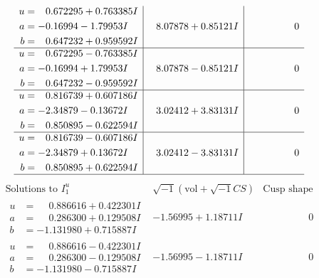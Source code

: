 \documentclass[1p]{elsarticle_modified}
\theoremstyle{definition}
\newcommand{\I}{\sqrt{-1}}
\begin{document}
$$\begin{array}{c|c|c}
\begin{aligned}
u &= \phantom{-}0.672295 + 0.763385 I \\
a &= -0.16994 - 1.79953 I \\
b &= \phantom{-}0.647232 + 0.959592 I\end{aligned}
 & \phantom{-}8.07878 + 0.85121 I & \phantom{-0.000000 } 0 \\ \hline\begin{aligned}
u &= \phantom{-}0.672295 - 0.763385 I \\
a &= -0.16994 + 1.79953 I \\
b &= \phantom{-}0.647232 - 0.959592 I\end{aligned}
 & \phantom{-}8.07878 - 0.85121 I & \phantom{-0.000000 } 0 \\ \hline\begin{aligned}
u &= \phantom{-}0.816739 + 0.607186 I \\
a &= -2.34879 - 0.13672 I \\
b &= \phantom{-}0.850895 - 0.622594 I\end{aligned}
 & \phantom{-}3.02412 + 3.83131 I & \phantom{-0.000000 } 0 \\ \hline\begin{aligned}
u &= \phantom{-}0.816739 - 0.607186 I \\
a &= -2.34879 + 0.13672 I \\
b &= \phantom{-}0.850895 + 0.622594 I\end{aligned}
 & \phantom{-}3.02412 - 3.83131 I & \phantom{-0.000000 } 0\\
 \hline 
 \end{array}$$\newpage$$\begin{array}{c|c|c}  
\text{Solutions to }I^u_{1}& \I (\text{vol} + \sqrt{-1}CS) & \text{Cusp shape}\\
 \hline 
\begin{aligned}
u &= \phantom{-}0.886616 + 0.422301 I \\
a &= \phantom{-}0.286300 + 0.129508 I \\
b &= -1.131980 + 0.715887 I\end{aligned}
 & -1.56995 + 1.18711 I & \phantom{-0.000000 } 0 \\ \hline\begin{aligned}
u &= \phantom{-}0.886616 - 0.422301 I \\
a &= \phantom{-}0.286300 - 0.129508 I \\
b &= -1.131980 - 0.715887 I\end{aligned}
 & -1.56995 - 1.18711 I & \phantom{-0.000000 } 0 \\ \hline\begin{aligned}

\end{aligned}
\end{array}$$
\end{document}
